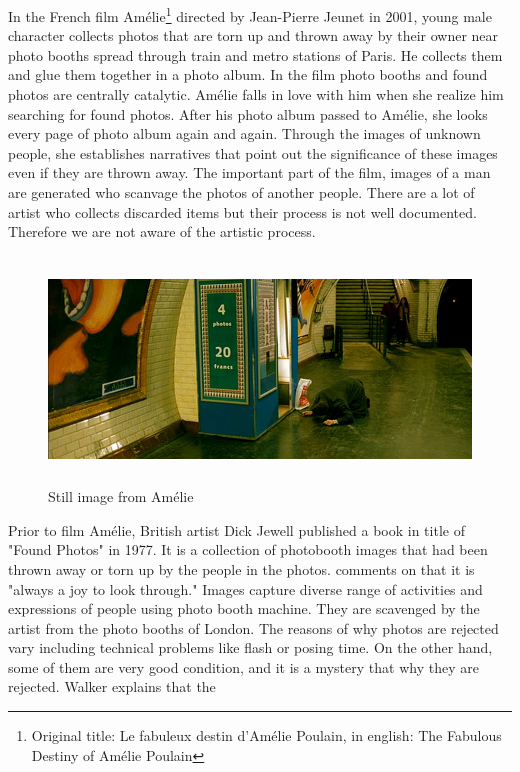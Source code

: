 In the French film Amélie\footnote{Original title: Le fabuleux destin d'Amélie Poulain, in english: The Fabulous Destiny of Amélie Poulain} directed by Jean-Pierre Jeunet in 2001, young male character collects photos that are torn up and thrown away by their owner near photo booths spread through train and metro stations of Paris. He collects them and glue them together in a photo album. In the film photo booths and found photos are centrally catalytic. Amélie falls in love with him when she realize him searching for found photos. After his photo album passed to Amélie, she looks every page of photo album again and again. Through the images of unknown people, she establishes narratives that point out the significance of these images even if they are thrown away. The important part of the film, images of a man are generated who scanvage the photos of another people. There are a lot of artist who collects discarded items but their process is not well documented. Therefore we are not aware of the artistic process. 

\begin{figure}[h!]
  \centering
  \includegraphics[height=6cm]{graphics/amelie_01.jpg}
  \caption{Still image from Amélie}
  \label{fig:Amelie}
\end{figure}

Prior to film Amélie, British artist Dick Jewell published a book in title of "Found Photos" in 1977. It is a collection of photobooth images that had been thrown away or torn up by the people in the photos. \cite{walker2010dick} comments on that it is "always a joy to look through." Images capture diverse range of activities and expressions of people using photo booth machine. They are scavenged by the artist from the photo booths of London. The reasons of why photos are rejected vary including technical problems like flash or posing time. On the other hand, some of them are very good condition, and it is a mystery that why they are rejected. Walker explains that the 

